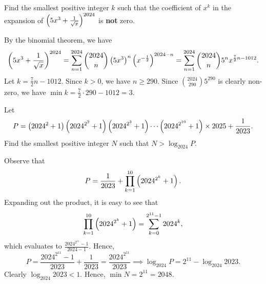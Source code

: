 \begin{question}[3]\label{A::2024-S-1-9}
    Find the smallest positive integer $k$ such that the coefficient of $x^k$ in the expansion of $\left( 5x^3 + \frac1{\sqrt{x}} \right)^{2024}$ is \textbf{not} zero.
\end{question}
\begin{solution*}
    By the binomial theorem, we have \[\left( 5x^3 + \frac1{\sqrt{x}} \right)^{2024} = \sum_{n = 1}^{2024} \binom{2024}{n} \left( 5x^3 \right)^n \left( x^{-\frac12} \right)^{2024-n} = \sum_{n = 1}^{2024} \binom{2024}{n} 5^n x^{\frac72 n - 1012}.\] Let $k = \frac72 n - 1012$. Since $k > 0$, we have $n \geq 290$. Since $\binom{2024}{290} 5^{290}$ is clearly non-zero, we have $\min k = \frac72 \cdot 290 - 1012 = 3$.
\end{solution*}

\begin{question}[2048]\label{A::2024-S-1-10}
    Let \[P = \left( 2024^2 + 1 \right)\left( 2024^{2^2} + 1 \right)\left( 2024^{2^3} + 1 \right)\cdots\left( 2024^{2^{10}} + 1 \right) \times 2025 + \dfrac1{2023}.\] Find the smallest positive integer $N$ such that $N > \log_{2024} P$.
\end{question}
\begin{solution*}
    Observe that \[P = \frac1{2023} + \prod_{k = 1}^{10} \left( 2024^{2^k} + 1 \right).\] Expanding out the product, it is easy to see that \[\prod_{k = 1}^{10} \left( 2024^{2^k} + 1 \right) = \sum_{k = 0}^{2^{11} - 1} 2024^k,\] which evaluates to $\frac{2024^{2^{11}} - 1}{2024 - 1}$. Hence, \[P = \frac{2024^{2^{11}} - 1}{2023} + \frac1{2023} = \frac{2024^{2^{11}}}{2023} \implies \log_{2024} P = 2^{11} - \log_{2024} 2023.\] Clearly $\log_{2024} 2023 < 1$. Hence, $\min N = 2^{11} = 2048$.
\end{solution*}

